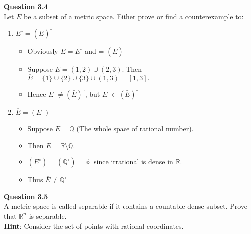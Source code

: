 \documentclass[12pt]{article}
\begin{document}
\newpage
\noindent
\textbf{Question 3.4}\\
Let $E$ be a subset of a metric space. Either prove or find a counterexample to:
\begin{enumerate}[label=(\roman*)]
    \item $E^\circ = (\bar{E})^\circ$
        \begin{itemize}
            \item Obviously $E = E^\circ$ and  = $(\overline{E})^\circ$
            \item Suppose $E = (1,2)\cup (2,3)$. Then $\overline{E} = \{1\} \cup \{2\} \cup \{3\} \cup (1,3) = [1,3].$
            \item Hence $E^\circ \neq (\bar{E})^\circ$, but $E^\circ \subset (\bar{E})^\circ$
        \end{itemize}
    \item $\overline{E} = \overline{(E^\circ)}$
        \begin{itemize}
            \item Suppose $E = \mathbb{Q}$ (The whole space of rational number).
            \item Then $\overline{E} = \mathbb{R}\setminus \mathbb{Q}$.
            \item $(\overline{E^\circ}) = (\overline{\mathbb{Q}^\circ}) = \phi\;$ since irrational is dense in $\mathbb{R}$.
            \item Thus $\overline{E} \neq \overline{\mathbb{Q}^\circ}$
        \end{itemize}
\end{enumerate}
 
 
 \newpage
 \noindent
 \textbf{Question 3.5}\\
 A metric space is called separable if it contains a countable dense subset. Prove that $\mathbb{R}^n$ is separable.\\
 \textbf{Hint}: Consider the set of points with rational coordinates.\\
 
\end{document}
